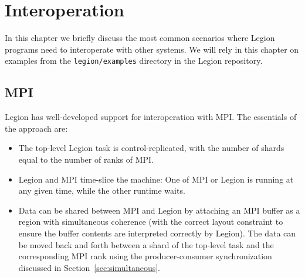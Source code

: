 \chapter{Interoperation}
\label{chap:interop}

In this chapter we briefly discuss the most common scenarios where Legion programs need to interoperate with other systems.  We will rely in this chapter on examples from the {\tt legion/examples} directory in the Legion repository.

\section{MPI}
\label{sec:mpi}

Legion has well-developed support for interoperation with MPI.  The essentials of the approach are:
\begin{itemize}
\item The top-level Legion task is control-replicated, with the number of shards equal to the number of ranks of MPI.
\item Legion and MPI time-slice the machine:  One of MPI or Legion is running at any given time, while the other runtime
  waits.
\item Data can be shared between MPI and Legion by attaching an MPI buffer as a region with simultaneous coherence (with the correct layout constraint
  to ensure the buffer contents are interpreted correctly by Legion).  The data can be moved back and forth between a shard of the top-level
  task and the corresponding MPI rank using the producer-consumer synchronization discussed in Section~\ref{sec:simultaneous}.
\end{itemize}

